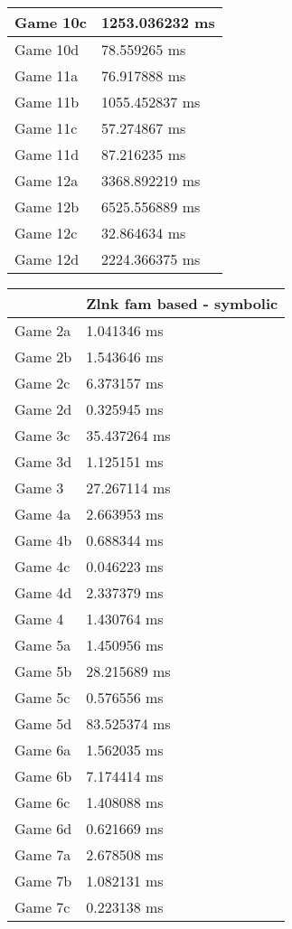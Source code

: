 \begin{tabular}{|l|l|}
	Game 10c & 1253.036232 ms \\ \hline
	Game 10d & 78.559265 ms \\ \hline
	Game 11a & 76.917888 ms \\ \hline
	Game 11b & 1055.452837 ms \\ \hline
	Game 11c & 57.274867 ms \\ \hline
	Game 11d & 87.216235 ms \\ \hline
	Game 12a & 3368.892219 ms \\ \hline
	Game 12b & 6525.556889 ms \\ \hline
	Game 12c & 32.864634 ms \\ \hline
	Game 12d & 2224.366375 ms \\ \hline
\end{tabular}
\begin{tabular}{|l|l|}
	\hline
	& Zlnk fam based - symbolic \\ \hline
	Game 2a & 1.041346 ms \\ \hline
	Game 2b & 1.543646 ms \\ \hline
	Game 2c & 6.373157 ms \\ \hline
	Game 2d & 0.325945 ms \\ \hline
	Game 3c & 35.437264 ms \\ \hline
	Game 3d & 1.125151 ms \\ \hline
	Game 3 & 27.267114 ms \\ \hline
	Game 4a & 2.663953 ms \\ \hline
	Game 4b & 0.688344 ms \\ \hline
	Game 4c & 0.046223 ms \\ \hline
	Game 4d & 2.337379 ms \\ \hline
	Game 4 & 1.430764 ms \\ \hline
	Game 5a & 1.450956 ms \\ \hline
	Game 5b & 28.215689 ms \\ \hline
	Game 5c & 0.576556 ms \\ \hline
	Game 5d & 83.525374 ms \\ \hline
	Game 6a & 1.562035 ms \\ \hline
	Game 6b & 7.174414 ms \\ \hline
	Game 6c & 1.408088 ms \\ \hline
	Game 6d & 0.621669 ms \\ \hline
	Game 7a & 2.678508 ms \\ \hline
	Game 7b & 1.082131 ms \\ \hline
	Game 7c & 0.223138 ms \\ \hline

\end{tabular}
